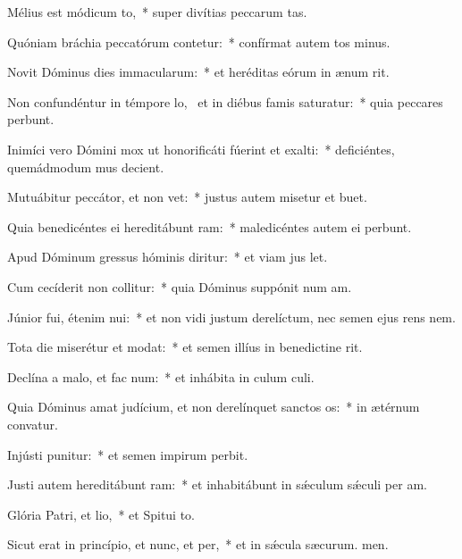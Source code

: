 \item Mélius est módicum to,~* super divítias peccarum tas.
\item Quóniam bráchia peccatórum contetur:~* confírmat autem tos minus.
\item Novit Dóminus dies immacularum:~* et heréditas eórum in ænum rit.
\item Non confundéntur in témpore lo,~\pscross{} et in diébus famis saturatur:~* quia peccares perbunt.
\item Inimíci vero Dómini mox ut honorificáti fúerint et exalti:~* deficiéntes, quemádmodum mus decient.
\item Mutuábitur peccátor, et non vet:~* justus autem misetur et buet.
\item Quia benedicéntes ei hereditábunt ram:~* maledicéntes autem ei perbunt.
\item Apud Dóminum gressus hóminis diritur:~* et viam jus let.
\item Cum cecíderit non collitur:~* quia Dóminus suppónit num am.
\item Júnior fui, étenim nui:~* et non vidi justum derelíctum, nec semen ejus rens nem.
\item Tota die miserétur et modat:~* et semen illíus in benedictine rit.
\item Declína a malo, et fac num:~* et inhábita in culum culi.
\item Quia Dóminus amat judícium, et non derelínquet sanctos os:~* in ætérnum convatur.
\item Injústi punitur:~* et semen impirum perbit.
\item Justi autem hereditábunt ram:~* et inhabitábunt in sǽculum sǽculi per am.
\item Glória Patri, et lio,~* et Spitui to.
\item Sicut erat in princípio, et nunc, et per,~* et in sǽcula sæcurum. men.
